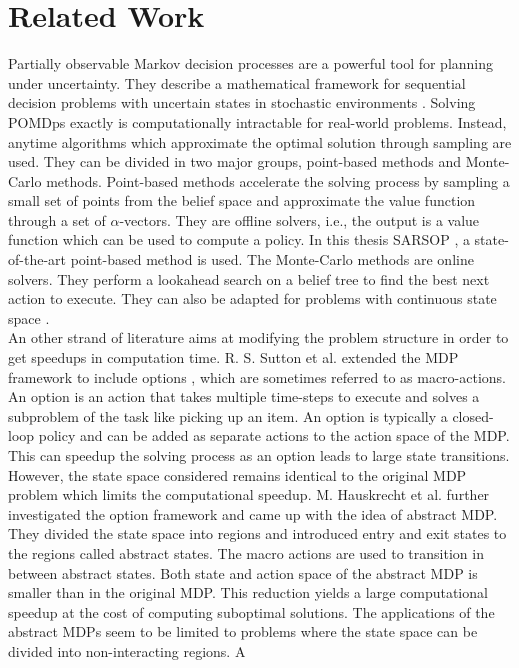 \section{Related Work}\label{sec:relatedwork}
Partially observable Markov decision processes are a powerful tool for planning under uncertainty. They describe a mathematical framework for sequential decision problems with uncertain states in stochastic environments \cite{10.2307/168926}. Solving POMDps exactly \cite{KAELBLING199899} is computationally intractable for real-world problems. Instead, anytime algorithms which approximate the optimal solution through sampling are used. They can be divided in two major groups, point-based methods and Monte-Carlo methods. Point-based methods \cite{10.5555/1630659.1630806, Spaan_2005, 6284837} accelerate the solving process by sampling a small set of points from the belief space and approximate the value function through a set of $\alpha$-vectors. They are offline solvers, i.e., the output is a value function which can be used to compute a policy. In this thesis SARSOP \cite{6284837}, a state-of-the-art point-based method is used. The Monte-Carlo methods \cite{NIPS2010_4031, NIPS2013_5189, Bai2011} are online solvers. They perform a lookahead search on a belief tree to find the best next action to execute. They can also be adapted for problems with continuous state space \cite{Bai2011}.\\

An other strand of literature aims at modifying the problem structure in order to get speedups in computation time. R. S. Sutton et al. extended the MDP framework to include options \cite{SUTTON1999181}, which are sometimes referred to as macro-actions. An option is an action that takes multiple time-steps to execute and solves a subproblem of the task like picking up an item.  An option is typically a closed-loop policy and can be added as separate actions to the action space of the MDP. This can speedup the solving process as an option leads to large state transitions. However, the state space considered remains identical to the original MDP problem which limits the computational speedup. M. Hauskrecht et al. further investigated the option framework and came up with the idea of abstract MDP\cite{DBLP:journals/corr/abs-1301-7381}. They divided the state space into regions and introduced entry and exit states to the regions called abstract states. The macro actions are used to transition in between abstract states. Both state and action space of the abstract MDP is smaller than in the original MDP. This reduction yields a large computational speedup at the cost of computing suboptimal solutions. The applications of the abstract MDPs seem to be limited to problems where the state space can be divided into non-interacting regions. A 


